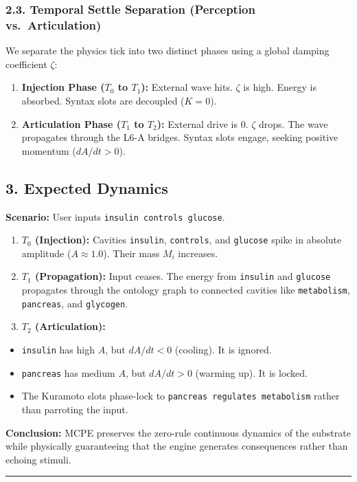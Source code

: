 \documentclass[
  11pt,
  a4paper,
]{article}
\providecommand{\tightlist}{%
  \setlength{\itemsep}{0pt}\setlength{\parskip}{0pt}}
\begin{document}
\subsubsection{2.3. Temporal Settle Separation (Perception
vs.~Articulation)}\label{temporal-settle-separation-perception-vs.-articulation}

We separate the physics tick into two distinct phases using a global
damping coefficient \(\zeta\):

\begin{enumerate}
\def\labelenumi{\arabic{enumi}.}
\tightlist
\item
  \textbf{Injection Phase (\(T_0\) to \(T_1\)):} External wave hits.
  \(\zeta\) is high. Energy is absorbed. Syntax slots are decoupled
  (\(K=0\)).
\item
  \textbf{Articulation Phase (\(T_1\) to \(T_2\)):} External drive is 0.
  \(\zeta\) drops. The wave propagates through the L6-A bridges. Syntax
  slots engage, seeking positive momentum (\(dA/dt > 0\)).
\end{enumerate}

\subsection{3. Expected Dynamics}\label{expected-dynamics}

\textbf{Scenario:} User inputs \texttt{insulin\ controls\ glucose}.

\begin{enumerate}
\def\labelenumi{\arabic{enumi}.}
\tightlist
\item
  \textbf{\(T_0\) (Injection):} Cavities \texttt{insulin},
  \texttt{controls}, and \texttt{glucose} spike in absolute amplitude
  (\(A \approx 1.0\)). Their mass \(M_i\) increases.
\item
  \textbf{\(T_1\) (Propagation):} Input ceases. The energy from
  \texttt{insulin} and \texttt{glucose} propagates through the ontology
  graph to connected cavities like \texttt{metabolism},
  \texttt{pancreas}, and \texttt{glycogen}.
\item
  \textbf{\(T_2\) (Articulation):}
\end{enumerate}

\begin{itemize}
\tightlist
\item
  \texttt{insulin} has high \(A\), but \(dA/dt < 0\) (cooling). It is
  ignored.
\item
  \texttt{pancreas} has medium \(A\), but \(dA/dt > 0\) (warming up). It
  is locked.
\item
  The Kuramoto slots phase-lock to
  \texttt{pancreas\ regulates\ metabolism} rather than parroting the
  input.
\end{itemize}

\textbf{Conclusion:} MCPE preserves the zero-rule continuous dynamics of
the substrate while physically guaranteeing that the engine generates
consequences rather than echoing stimuli.

\begin{center}\rule{0.5\linewidth}{0.5pt}\end{center}
\end{document}
